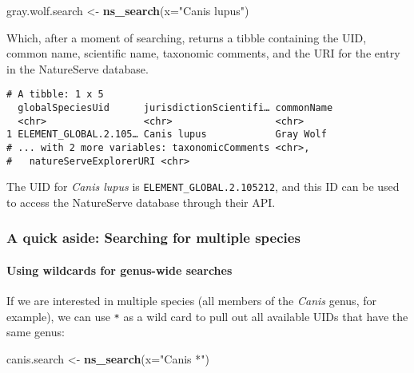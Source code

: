 \documentclass[]{article}
\newenvironment{Shaded}{\begin{snugshade}}{\end{snugshade}}
\newcommand{\DataTypeTok}[1]{\textcolor[rgb]{0.13,0.29,0.53}{#1}}
\newcommand{\KeywordTok}[1]{\textcolor[rgb]{0.13,0.29,0.53}{\textbf{#1}}}
\newcommand{\NormalTok}[1]{#1}
\newcommand{\StringTok}[1]{\textcolor[rgb]{0.31,0.60,0.02}{#1}}
\let\oldparagraph\paragraph
\renewcommand{\paragraph}[1]{\oldparagraph{#1}\mbox{}}
\begin{document}
\begin{Shaded}
\begin{Highlighting}[]
\NormalTok{gray.wolf.search <-}\StringTok{ }\KeywordTok{ns_search}\NormalTok{(}\DataTypeTok{x=}\StringTok{"Canis lupus"}\NormalTok{)}
\end{Highlighting}
\end{Shaded}

Which, after a moment of searching, returns a tibble containing the UID,
common name, scientific name, taxonomic comments, and the URI for the
entry in the NatureServe database.

\begin{verbatim}
# A tibble: 1 x 5
  globalSpeciesUid      jurisdictionScientifi… commonName
  <chr>                 <chr>                  <chr>     
1 ELEMENT_GLOBAL.2.105… Canis lupus            Gray Wolf 
# ... with 2 more variables: taxonomicComments <chr>,
#   natureServeExplorerURI <chr>
\end{verbatim}

The UID for \emph{Canis lupus} is \texttt{ELEMENT\_GLOBAL.2.105212}, and
this ID can be used to access the NatureServe database through their
API.

\hypertarget{a-quick-aside-searching-for-multiple-species}{%
\subsubsection{A quick aside: Searching for multiple
species}\label{a-quick-aside-searching-for-multiple-species}}

\hypertarget{using-wildcards-for-genus-wide-searches}{%
\paragraph{Using wildcards for genus-wide
searches}\label{using-wildcards-for-genus-wide-searches}}

If we are interested in multiple species (all members of the
\emph{Canis} genus, for example), we can use \texttt{*} as a wild card
to pull out all available UIDs that have the same genus:

\begin{Shaded}
\begin{Highlighting}[]
\NormalTok{canis.search <-}\StringTok{ }\KeywordTok{ns_search}\NormalTok{(}\DataTypeTok{x=}\StringTok{"Canis *"}\NormalTok{)}
\end{Highlighting}
\end{Shaded}
\end{document}
